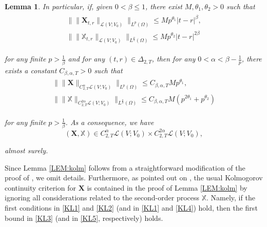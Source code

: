 \documentclass[letterpaper, 11pt,  reqno]{amsart}
\newtheorem{lemma}[theorem]{Lemma}
\newcommand{\1}{\hspace{0.5mm}\textup{I}\hspace{0.5mm}}
\newcommand{\noi}{\noindent}
\renewcommand{\L}{\mathcal{L}}
\newcommand{\al}{\alpha}
\newcommand{\be}{\beta}
\newcommand{\Dl}{\Delta}
\newcommand{\ta}{\theta}
\newcommand{\XXb}{\mathbb{X}}
\newcommand{\Om}{\Omega}
\newcommand{\XX}{\mathbf{X}}
\numberwithin{equation}{section}
\numberwithin{theorem}{section}
\begin{document}
\begin{lemma}
In particular, 
if, given $0 < \be\le 1$,  there exist $M, \ta_1, \ta_2 > 0$ such that 
\begin{align}
\begin{split}
\big\| \|  \XX_{t,r} \|_{\L(V; V_0)} \big\|_{L^p(\Om)} \le M p^{\ta_1} |t-r|^\be,\\
\big\| \|  \XXb_{t,r} \|_{\L(V; V_0)} \big\|_{L^\frac p2(\Om)} \le M p^{\ta_2} |t-r|^{2\be}
\end{split}
\label{KL4}
\end{align}

\noi
for any finite $p > \frac 1\be$
and for any $(t, r) \in \Dl_{2, T}$, 
 then 
 for any $0<\al<\be-\frac{1}{p}$, there exists 
a constant $C_{\be,\al, T} >0$ such that
\begin{align}
\begin{split}
\big\| \|\XX\|_{C^\al_{2,T} \L(V; V_0)} \big\|_{L^p(\Om)} \le C_{\be,\al, T} Mp^{\ta_1}, \\
\big\| \|\XXb\|_{C^{2\al}_{2,T} \L(V; V_0)} \big\|_{L^\frac p2(\Om)} \le C_{\be,\al, T} M
(p^{2\ta_1} + p^{\ta_2})
\end{split}
\label{KL5}
\end{align}

\noi
for any finite $p > \frac 1\be$.
As a consequence, we have
\[ (\XX, \XXb) 
\in C^\al_{2,T} \L(V; V_0) \times 
C^{2\al}_{2,T} \L(V; V_0), 
\]

\noi
almost surely.
\end{lemma}








Since Lemma \ref{LEM:kolm}
follows
from 
a straightforward modification of the proof of 
\cite[Theorem~3.1]{FH20}, 
we omit details.
Furthermore, 
as pointed out on \cite[p.\,41]{FH20}, 
the usual Kolmogorov continuity criterion 
for $\XX$ is contained in the proof of Lemma \ref{LEM:kolm}
by ignoring all considerations related to the second-order
process $\XXb$.
Namely, if the first conditions in \eqref{KL1}
and \eqref{KL2} (and in 
\eqref{KL1}
and \eqref{KL4})
hold, 
then the first bound in \eqref{KL3}
(and in \eqref{KL5}, respectively)
holds.
\end{document}

